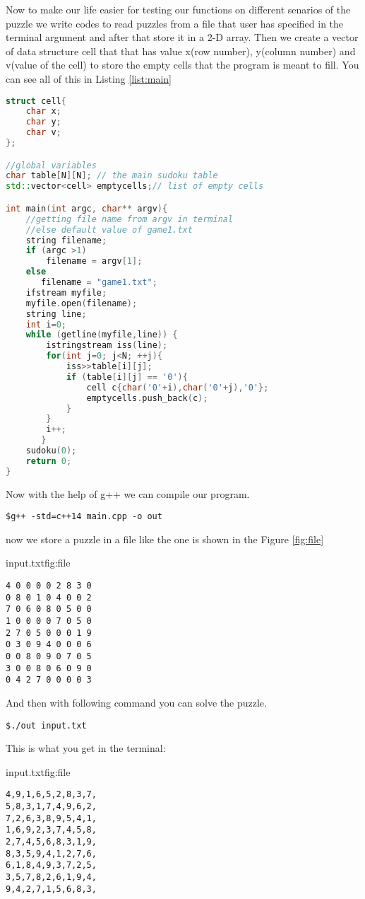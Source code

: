 Now to make our life easier for testing our functions on
different senarios of the puzzle we write codes to read puzzles
from a file that user has specified in the terminal argument
and after that store it in a 2-D array. Then we create
a vector of data structure cell that that has value x(row number),
y(column number) and v(value of the cell) to store the empty
cells that the program is meant to fill. You can see all of this
in Listing \ref{list:main}
\begin{lstlisting}[style=mystyle,
language=C++, 
caption=other parts of program,
label=list:main]
struct cell{
    char x;
    char y;
    char v;
};

//global variables
char table[N][N]; // the main sudoku table
std::vector<cell> emptycells;// list of empty cells

int main(int argc, char** argv){
    //getting file name from argv in terminal
    //else default value of game1.txt
    string filename;
    if (argc >1)
        filename = argv[1];
    else
       filename = "game1.txt";
    ifstream myfile;
    myfile.open(filename);
    string line;
    int i=0;
    while (getline(myfile,line)) {
        istringstream iss(line);
        for(int j=0; j<N; ++j){
            iss>>table[i][j];
            if (table[i][j] == '0'){
                cell c{char('0'+i),char('0'+j),'0'};
                emptycells.push_back(c);
            }
        }
        i++;     
       }
    sudoku(0);
    return 0;
}
\end{lstlisting}
Now with the help of g++ we can compile our program.
\begin{lstlisting}
$g++ -std=c++14 main.cpp -o out
\end{lstlisting}
now we store a puzzle in a file like the one is shown in
the Figure \ref{fig:file}
\begin{fig-shaded}{input.txt}{fig:file}
\begin{lstlisting}
4 0 0 0 0 2 8 3 0
0 8 0 1 0 4 0 0 2
7 0 6 0 8 0 5 0 0
1 0 0 0 0 7 0 5 0
2 7 0 5 0 0 0 1 9
0 3 0 9 4 0 0 0 6
0 0 8 0 9 0 7 0 5
3 0 0 8 0 6 0 9 0
0 4 2 7 0 0 0 0 3
\end{lstlisting}
\end{fig-shaded}
And then with following command you can solve the puzzle.
\begin{lstlisting}
$./out input.txt
\end{lstlisting}
This is what you get in the terminal:
\begin{fig-shaded}{input.txt}{fig:file}
\begin{lstlisting}
4,9,1,6,5,2,8,3,7,
5,8,3,1,7,4,9,6,2,
7,2,6,3,8,9,5,4,1,
1,6,9,2,3,7,4,5,8,
2,7,4,5,6,8,3,1,9,
8,3,5,9,4,1,2,7,6,
6,1,8,4,9,3,7,2,5,
3,5,7,8,2,6,1,9,4,
9,4,2,7,1,5,6,8,3,
\end{lstlisting}
\end{fig-shaded}